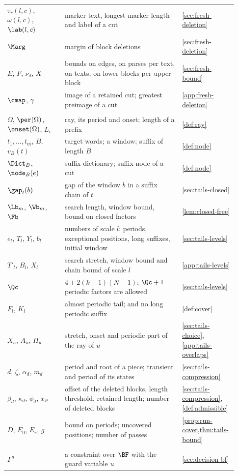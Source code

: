 {\begin{longtable}{@{}>{\raggedright\arraybackslash}p{0.24\linewidth}>{\raggedright\arraybackslash}p{0.49\linewidth}>{\raggedright\arraybackslash}p{0.20\linewidth}@{}}
$\tau_r(l,c)$, $\omega(l,c)$, $\lab(l,c)$ & marker text, longest marker length and label of a cut & \cref{sec:fresh-deletion} \\
$\Marg$ & margin of block deletions & \cref{sec:fresh-deletion} \\
$E$, $F$, $\nu_d$, $X$ & bounds on edges, on parses per text, on texts, on lower blocks per upper block & \cref{sec:fresh-bound} \\
$\cmap$, $\gamma$ & image of a retained cut; greatest preimage of a cut & \cref{app:fresh-deletion} \\
\addlinespace
\multicolumn{3}{@{}l}{\emph{Rejected tails}}\\
$\Omega$, $\per(\Omega)$, $\onset(\Omega)$, $L_i$ & ray, its period and onset; length of a prefix & \cref{def:ray} \\
$t_1,\dots,t_m$, $B$, $v_B(t)$ & target words; a window; suffix of length $B$ & \cref{def:node} \\
$\Dict_B$, $\node_B(e)$ & suffix dictionary; suffix node of a cut & \cref{def:node} \\
$\gap_t(b)$ & gap of the window $b$ in a suffix chain of $t$ & \cref{sec:tails-closed} \\
$\Lb_m$, $\Wb_m$, $\Fb$ & search length, window bound, bound on closed factors & \cref{lem:closed-free} \\
$e_l$, $T_l$, $Y_l$, $b_l$ & numbers of scale $l$: periods, exceptional positions, long suffixes, initial window & \cref{sec:tails-levels} \\
$T'_l$, $B_l$, $X_l$ & search stretch, window bound and chain bound of scale $l$ & \cref{app:tails-levels} \\
$\Qc$ & $4+2(k-1)(N-1)$; $\Qc+1$ periodic factors are allowed & \cref{sec:tails-levels} \\
$F_l$, $K_l$ & almost periodic tail; and no long periodic suffix & \cref{def:cover} \\
$X_u$, $A_u$, $\Pi_u$ & stretch, onset and periodic part of the ray of $u$ & \cref{sec:tails-choice}, \cref{app:tails-overlaps} \\
$d$, $\zeta$, $\alpha_d$, $m_d$ & period and root of a piece; transient and period of its states & \cref{sec:tails-compression} \\
$\beta_d$, $\kappa_d$, $\phi_d$, $x_P$ & offset of the deleted blocks, length threshold, retained length; number of deleted blocks & \cref{sec:tails-compression}, \cref{def:admissible} \\
$D$, $E_0$, $E_r$, $g$ & bound on periods; uncovered positions; number of passes & \cref{prop:run-cover,thm:tails-bound} \\
\addlinespace
\multicolumn{3}{@{}l}{\emph{Decision procedures}}\\
$\Gamma^{g}$ & a constraint over $\BF$ with the guard variable $u$ & \cref{sec:decision-bf} \\
\end{longtable}}
